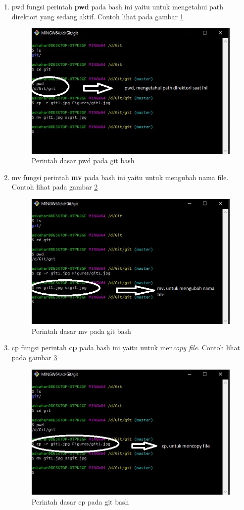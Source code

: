 \begin{enumerate}
\item pwd 
	fungsi perintah \textbf{pwd} pada bash ini yaitu untuk mengetahui path direktori yang sedang aktif.
Contoh lihat pada gambar \ref{pwd}
\begin{figure}[!htbp]
\centerline{\includegraphics[width=.75\textwidth]{Figures/pwd.jpg}}
\caption{Perintah dasar pwd pada git bash}
\label{pwd}
\end{figure}

\item mv 
	fungsi perintah \textbf{mv} pada bash ini yaitu untuk mengubah nama file.
Contoh lihat pada gambar \ref{mv}
\begin{figure}[!htbp]
\centerline{\includegraphics[width=.75\textwidth]{Figures/mv.jpg}}
\caption{Perintah dasar mv pada git bash}
\label{mv}
\end{figure}

\item cp
	fungsi perintah \textbf{cp} pada bash ini yaitu untuk men\textit{copy file}.
Contoh lihat pada gambar \ref{cp}
\begin{figure}[!htbp]
\centerline{\includegraphics[width=.75\textwidth]{Figures/cp.jpg}}
\caption{Perintah dasar cp pada git bash}
\label{cp}
\end{figure}


\end{enumerate}
